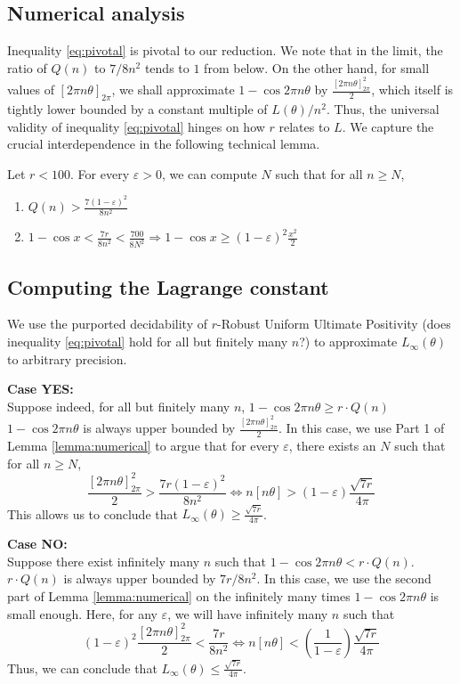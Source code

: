 \subsection{Numerical analysis}
Inequality \ref{eq:pivotal} is pivotal to our reduction. We note that in the limit, the ratio of $Q(n)$ to $7/8n^2$ tends to $1$ from below. On the other hand, for small values of $[2\pi n\theta]_{2\pi}$, we shall approximate $1 -\cos 2\pi n \theta$ by $\frac{[2\pi n\theta]_{2\pi}^2}{2}$, which itself is tightly lower bounded by a constant multiple of $L(\theta)/n^2$. Thus, the universal validity of inequality \ref{eq:pivotal} hinges on how $r$ relates to $L$. We capture the crucial interdependence in the following technical lemma.

\begin{lemma}
\label{lemma:numerical}
Let $r < 100$. For every $\varepsilon > 0$, we can compute $N$ such that for all $n \ge N$,
\begin{enumerate}
\item $Q(n) > \frac{7(1-\varepsilon)^2}{8n^2}$
\item $1 - \cos x < \frac{7r}{8n^2} < \frac{700}{8N^2}  \Rightarrow 1- \cos x \ge (1 - \varepsilon)^2\frac{x^2}{2}$
\end{enumerate}
\end{lemma}

\subsection{Computing the Lagrange constant}
We use the purported decidability of $r$-Robust Uniform Ultimate Positivity (does inequality \ref{eq:pivotal} hold for all but finitely many $n$?) to approximate $L_\infty(\theta)$ to arbitrary precision. 

\textbf{Case YES:} \\
Suppose indeed, for all but finitely many $n$,
$
1 - \cos 2\pi n\theta \ge r \cdot Q(n)
$ \\
$1 - \cos 2\pi n\theta$ is always upper bounded by $\frac{[2\pi n\theta]_{2\pi}^2}{2}$. In this case, we use Part 1 of Lemma \ref{lemma:numerical} to argue that for every $\varepsilon$, there exists an $N$ such that for all $n \ge N$,
$$
\frac{[2\pi n \theta]_{2\pi}^2}{2} > \frac{7r(1 - \varepsilon)^2}{8n^2} \Leftrightarrow n[n\theta] > (1 - \varepsilon)\frac{\sqrt{7r}}{4\pi}
$$
This allows us to conclude that $L_\infty(\theta) \ge \frac{\sqrt{7r}}{4\pi}$.

\textbf{Case NO:} \\
Suppose there exist infinitely many $n$ such that 
$
1 - \cos 2\pi n\theta < r \cdot Q(n)
$. \\
$r \cdot Q(n)$ is always upper bounded by $7r/8n^2$. In this case, we use the second part of Lemma \ref{lemma:numerical} on the infinitely many times $1 - \cos 2\pi n\theta$ is small enough. Here, for any $\varepsilon$, we will have infinitely many $n$ such that
$$
(1 - \varepsilon)^2 \frac{[2\pi n \theta]_{2\pi}^2}{2} < \frac{7r}{8n^2} \Leftrightarrow n[n\theta] < \left(\frac{1}{1-\varepsilon}\right)\frac{\sqrt{7r}}{4\pi}
$$ 
Thus, we can conclude that $L_\infty(\theta) \le \frac{\sqrt{7r}}{4\pi}$.

